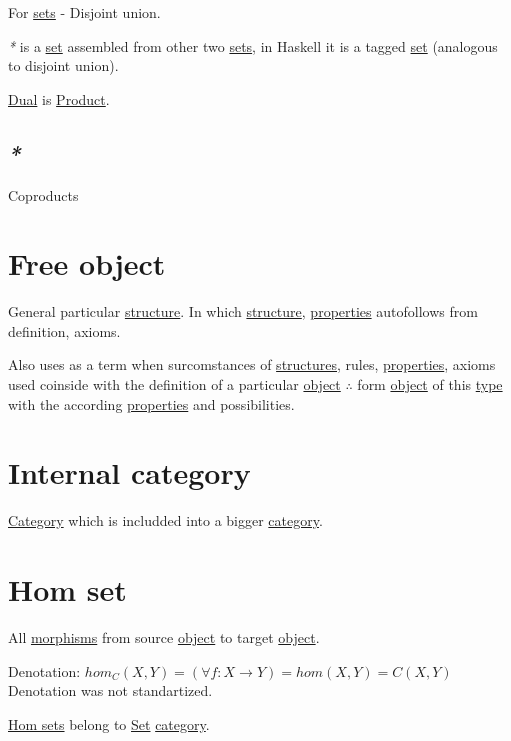\documentclass[a4paper,14pt,oneside]{book}
\begin{document}
For \hyperref[orgfcb3af7]{sets} - Disjoint union.

\emph{*} is a \hyperref[org128a409]{set} assembled from other two \hyperref[orgfcb3af7]{sets}, in Haskell it is a tagged \hyperref[org128a409]{set} (analogous to disjoint union).

\hyperref[orgce6137f]{Dual} is \hyperref[org90a2f94]{Product}.

\subsection{\emph{*}}
\label{sec:org9358de4}

\label{org97f05fe}Coproducts

\section{\label{org3b2d6d2}Free object}
\label{sec:org0674b17}
General particular \hyperref[org2f3ef45]{structure}.
In which \hyperref[org2f3ef45]{structure}, \hyperref[orgff8ecf0]{properties} autofollows from definition, axioms.

Also uses as a term when surcomstances of \hyperref[orgdb661ac]{structures}, rules, \hyperref[orgff8ecf0]{properties}, axioms used coinside with the definition of a particular \hyperref[orged022cb]{object} \(\therefore\) form \hyperref[orged022cb]{object} of this \hyperref[org1eff537]{type} with the according \hyperref[orgff8ecf0]{properties} and possibilities.

\section{\label{org1c4da8f}Internal category}
\label{sec:org7cf92d0}
\hyperref[orge2e250a]{Category} which is includded into a bigger \hyperref[orge2e250a]{category}.

\section{\label{org03e5c3c}Hom set}
\label{sec:orgcbe9332}
All \hyperref[org46b4110]{morphisms} from source \hyperref[orged022cb]{object} to target \hyperref[orged022cb]{object}.

Denotation:
\(hom_{C}(X,Y) = (\forall f: X \to Y) = hom(X,Y) = C(X,Y)\)
Denotation was not standartized.

\hyperref[org3ba1ef4]{Hom sets} belong to \hyperref[org128a409]{Set} \hyperref[orge2e250a]{category}.
\end{document}
